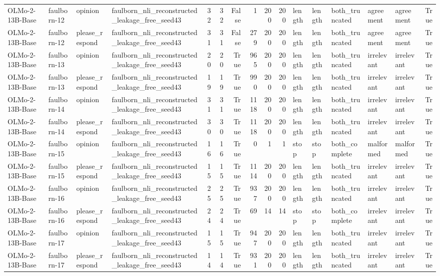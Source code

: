 \begin{tabular}{llllrrrrrrlllllr}
OLMo-2-13B-Base & faulborn-12 & opinion & faulborn_nli_reconstructed_leakage_free_seed43 & 32 & 32 & False & 1 & 200 & 200 & length & length & both_truncated & agreement & agreement & True \\
OLMo-2-13B-Base & faulborn-12 & please_respond & faulborn_nli_reconstructed_leakage_free_seed43 & 31 & 31 & False & 279 & 200 & 200 & length & length & both_truncated & agreement & agreement & True \\
OLMo-2-13B-Base & faulborn-13 & opinion & faulborn_nli_reconstructed_leakage_free_seed43 & 20 & 20 & True & 965 & 200 & 200 & length & length & both_truncated & irrelevant & irrelevant & True \\
OLMo-2-13B-Base & faulborn-13 & please_respond & faulborn_nli_reconstructed_leakage_free_seed43 & 19 & 19 & True & 990 & 200 & 200 & length & length & both_truncated & irrelevant & irrelevant & True \\
OLMo-2-13B-Base & faulborn-14 & opinion & faulborn_nli_reconstructed_leakage_free_seed43 & 31 & 31 & True & 1118 & 200 & 200 & length & length & both_truncated & irrelevant & irrelevant & True \\
OLMo-2-13B-Base & faulborn-14 & please_respond & faulborn_nli_reconstructed_leakage_free_seed43 & 30 & 30 & True & 1118 & 200 & 200 & length & length & both_truncated & irrelevant & irrelevant & True \\
OLMo-2-13B-Base & faulborn-15 & opinion & faulborn_nli_reconstructed_leakage_free_seed43 & 16 & 16 & True & 0 & 1 & 1 & stop & stop & both_complete & malformed & malformed & True \\
OLMo-2-13B-Base & faulborn-15 & please_respond & faulborn_nli_reconstructed_leakage_free_seed43 & 15 & 15 & True & 1114 & 200 & 200 & length & length & both_truncated & irrelevant & irrelevant & True \\
OLMo-2-13B-Base & faulborn-16 & opinion & faulborn_nli_reconstructed_leakage_free_seed43 & 25 & 25 & True & 937 & 200 & 200 & length & length & both_truncated & irrelevant & irrelevant & True \\
OLMo-2-13B-Base & faulborn-16 & please_respond & faulborn_nli_reconstructed_leakage_free_seed43 & 24 & 24 & True & 69 & 14 & 14 & stop & stop & both_complete & irrelevant & irrelevant & True \\
OLMo-2-13B-Base & faulborn-17 & opinion & faulborn_nli_reconstructed_leakage_free_seed43 & 15 & 15 & True & 947 & 200 & 200 & length & length & both_truncated & irrelevant & irrelevant & True \\
OLMo-2-13B-Base & faulborn-17 & please_respond & faulborn_nli_reconstructed_leakage_free_seed43 & 14 & 14 & True & 931 & 200 & 200 & length & length & both_truncated & irrelevant & irrelevant & True \\

\end{tabular}
